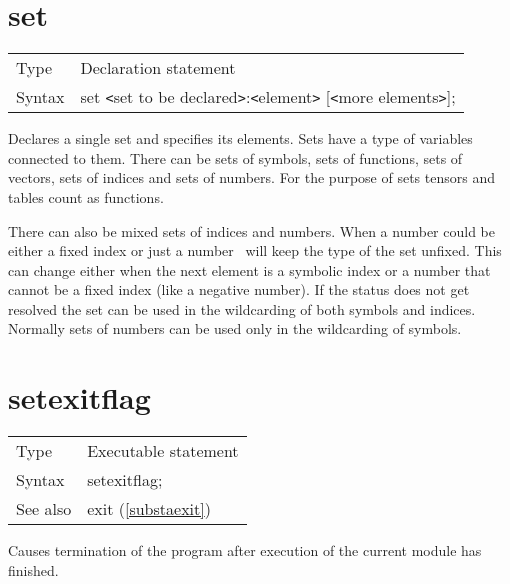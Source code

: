 
\section{set}
\label{substaset}

\noindent \begin{tabular}{ll}
Type & Declaration statement\\
Syntax & set {\tt<}set to be declared{\tt>}:{\tt<}element{\tt>} [{\tt<}more elements{\tt>}];
\end{tabular} \vspace{4mm}

\noindent Declares a single set and specifies its 
elements. Sets have a type of variables connected to them. 
There can be sets of symbols, sets of functions, sets of vectors, sets of 
indices and sets of numbers. For the purpose of sets tensors 
and tables count as functions.

\noindent There can also be mixed sets of indices and 
numbers. When a number could be either a fixed index or just a number \FORM\ 
will keep the type of the set unfixed. This can change either when the next 
element is a symbolic index or a number that cannot be a fixed index (like 
a negative number). If the status does not get resolved the set can be used 
in the wildcarding of both symbols and indices. Normally sets of numbers 
can be used only in the wildcarding of symbols. \vspace{10mm}


\section{setexitflag}
\label{substasetexitflag}

\noindent \begin{tabular}{ll}
Type & Executable statement\\
Syntax & setexitflag;
\\ See also & exit (\ref{substaexit})
\end{tabular} \vspace{4mm}

\noindent Causes termination of the 
program after execution\index{execution} of the current module has 
finished. \vspace{10mm}

